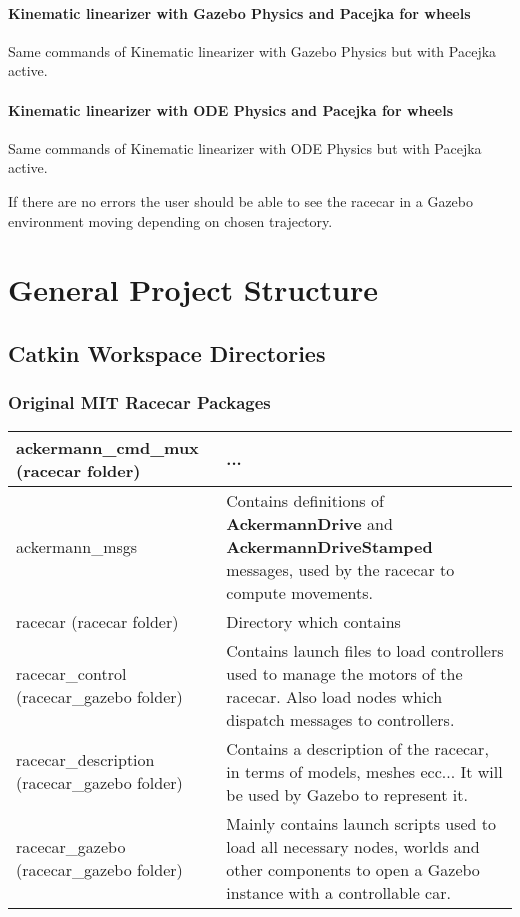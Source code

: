 \documentclass[12pt, letterpaper]{report}
\begin{document}
\subsubsection{Kinematic linearizer with Gazebo Physics and Pacejka for wheels}

Same commands of Kinematic linearizer with Gazebo Physics but with Pacejka active.

\subsubsection{Kinematic linearizer with ODE Physics and Pacejka for wheels}

Same commands of Kinematic linearizer with ODE Physics but with Pacejka active.

If there are no errors the user should be able to see the racecar in a Gazebo environment moving depending on chosen trajectory.

\chapter{General Project Structure}

\section{Catkin Workspace Directories}

\subsection{Original MIT Racecar Packages}

\begin{center}
	\begin{tabularx}{\textwidth}{
			| >{\raggedright\arraybackslash}X
			| >{\arraybackslash}X |
		}
		\hline
		ackermann\_cmd\_mux (racecar folder) & ... \\
		\hline
		ackermann\_msgs & Contains definitions of \textbf{AckermannDrive} and \textbf{AckermannDriveStamped} messages, used by the racecar to compute movements. \\
		\hline
		racecar (racecar folder) & Directory which contains \\
		\hline
		racecar\_control (racecar\_gazebo folder) & Contains launch files to load controllers used to manage the motors of the racecar. Also load nodes which dispatch messages to controllers. \\
		\hline
		racecar\_description (racecar\_gazebo folder) & Contains a description of the racecar, in terms of models, meshes ecc... It will be used by Gazebo to represent it. \\
		\hline
		racecar\_gazebo (racecar\_gazebo folder) & Mainly contains launch scripts used to load all necessary nodes, worlds and other components to open a Gazebo instance with a controllable car. \\
		\hline
	\end{tabularx}
\end{center}
\end{document}
